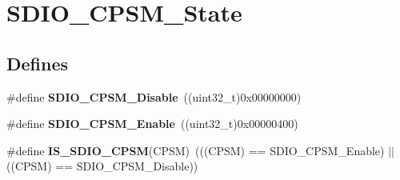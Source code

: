 \hypertarget{group__SDIO__CPSM__State}{
\section{SDIO\_\-CPSM\_\-State}
\label{group__SDIO__CPSM__State}
}
\subsection*{Defines}
\begin{DoxyCompactItemize}
\item 
\hypertarget{group__SDIO__CPSM__State_ga996751273ad238e255a740f7c2844c6c}{
\#define {\bfseries SDIO\_\-CPSM\_\-Disable}~((uint32\_\-t)0x00000000)}
\label{group__SDIO__CPSM__State_ga996751273ad238e255a740f7c2844c6c}

\item 
\hypertarget{group__SDIO__CPSM__State_gad437cefe89d6175aa074a1c40b909ebc}{
\#define {\bfseries SDIO\_\-CPSM\_\-Enable}~((uint32\_\-t)0x00000400)}
\label{group__SDIO__CPSM__State_gad437cefe89d6175aa074a1c40b909ebc}

\item 
\hypertarget{group__SDIO__CPSM__State_ga58cf04903dab015106e4e0937bef443b}{
\#define {\bfseries IS\_\-SDIO\_\-CPSM}(CPSM)~(((CPSM) == SDIO\_\-CPSM\_\-Enable) $|$$|$ ((CPSM) == SDIO\_\-CPSM\_\-Disable))}
\label{group__SDIO__CPSM__State_ga58cf04903dab015106e4e0937bef443b}

\end{DoxyCompactItemize}
